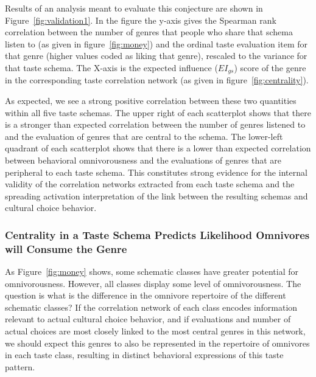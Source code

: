 \documentclass[preprint, authoryear,11pt, 3p]{elsarticle}
\begin{document}
Results of an analysis meant to evaluate this conjecture are shown in Figure~\ref{fig:validation1}. In the figure the y-axis gives the Spearman rank correlation between the number of genres that people who share that schema listen to (as given in figure~\ref{fig:money}) and the ordinal taste evaluation item for that genre (higher values coded as liking that genre), rescaled to the variance for that taste schema. The X-axis is the expected influence ($EI_{gs}$) score of the genre in the corresponding taste correlation network (as given in figure~\ref{fig:centrality}). 

As expected, we see a strong positive correlation between these two quantities within all five taste schemas. The upper right of each scatterplot shows that there is a stronger than expected correlation between the number of genres listened to and the evaluation of genres that are central to the schema. The lower-left quadrant of each scatterplot shows that there is a lower than expected correlation between behavioral omnivorousness and the evaluations of genres that are peripheral to each taste schema. This constitutes strong evidence for the internal validity of the correlation networks extracted from each taste schema and the spreading activation interpretation of the link between the resulting schemas and cultural choice behavior. 

\subsubsection{Centrality in a Taste Schema Predicts Likelihood Omnivores will Consume the Genre}
As Figure~\ref{fig:money} shows, some schematic classes have greater potential for omnivorousness. However, all classes display some level of omnivorousness. The question is what is the difference in the omnivore repertoire of the different schematic classes? If the correlation network of each class encodes information relevant to actual cultural choice behavior, and if evaluations and number of actual choices are most closely linked to the most central genres in this network, we should expect this genres to also be represented in the repertoire of omnivores in each taste class, resulting in distinct behavioral expressions of this taste pattern. 
\end{document}
